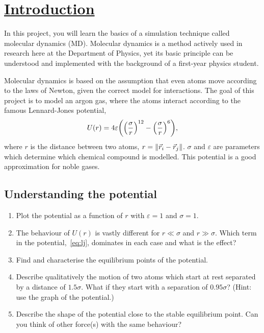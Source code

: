 \documentclass[11pt,british,a4paper]{report}
\begin{document}
\section{\underline{Introduction}}
In this project, you will learn the basics of a simulation technique called molecular dynamics (MD). Molecular dynamics is a method actively used in research here at the Department of Physics, yet its basic principle can be understood and implemented with the background of a first-year physics student.

Molecular dynamics is based on the assumption that even atoms move according to the laws of Newton, given the correct model for interactions. The goal of this project is to model an argon gas, where the atoms interact according to the famous Lennard-Jones potential,
\begin{equation}
    U(r) = 4\varepsilon\qty(\qty(\frac{\sigma}{r})^{12} - \qty(\frac{\sigma}{r})^6), \label{eq:lj}
\end{equation}
where \(r\) is the distance between two atoms, \(r=\norm{\vec{r}_i-\vec{r}_j}\). \(\sigma\) and \(\varepsilon\) are parameters which determine which chemical compound is modelled. This potential is a good approximation for noble gases.

\subsection{Understanding the potential}\label{subsec:understanding}
\begin{enumerate}[label=\roman*.]
    \item Plot the potential as a function of \(r\) with \(\varepsilon=1\) and \(\sigma=1\).
    \item The behaviour of \(U(r)\) is vastly different for \(r \ll \sigma\) and \(r \gg \sigma\). Which term in the potential,~\vref{eq:lj}, dominates in each case and what is the effect?
    \item Find and characterise the equilibrium points of the potential.
    \item Describe qualitatively the motion of two atoms which start at rest separated by a distance of \(\num{1.5}\sigma\). What if they start with a separation of \(\num{0.95}\sigma\)?  (Hint: use the graph of the potential.)
    \item Describe the shape of the potential close to the stable equilibrium point. Can you think of other force(s) with the same behaviour?
\end{enumerate}
\end{document}

